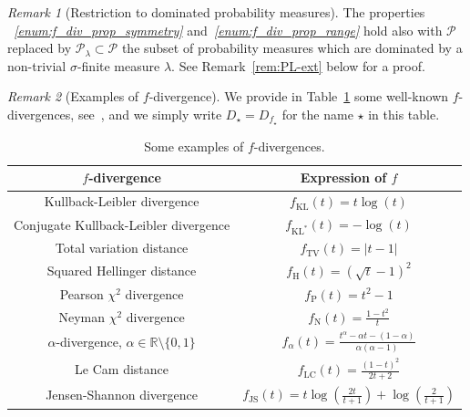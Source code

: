 \documentclass[12pt]{article}
\newcommand{\cp}{{\mathcal P}}
\newcommand{\R}{{\mathbb R}}
\theoremstyle{plain}
\theoremstyle{remark}
\newtheorem{rem}{Remark}
\begin{document}
\begin{rem}[Restriction to dominated probability measures]
  \label{rem:ext-to-Pl}
  The                          properties {\it ~\ref{enum:f_div_prop_symmetry}}
  and{\it ~\ref{enum:f_div_prop_range}}  hold  also  with  $\cp$  replaced  by
  $\cp_\lambda\subset\cp$ the  subset of probability measures  which are
  dominated  by a  non-trivial  $\sigma$-finite  measure $\lambda$.  See
  Remark~\ref{rem:PL-ext} below for a proof.
\end{rem}





\begin{rem}[Examples of $f$-divergence]
   \label{rem:exple-Df}
   We  provide  in Table~\ref{tab:list_of_fdivergence}  some  well-known
   $f$-divergences,  see~\cite{ca:abc-divergence},  and we  simply  write
   $D_\star=D_{f_\star}$ for the name $\star$ in this table.


\begin{table}[htbp]
    \renewcommand{\arraystretch}{1.25}
    \centering
    \begin{tabular}{|c|c|}
        \hline
        $f$-divergence & Expression of $f$
         \\
        \hline
        Kullback-Leibler divergence & $f_\mathrm{KL}(t) = t \log(t)$
        \\
        Conjugate Kullback-Leibler divergence & $f_{\mathrm{KL}^*}(t) = -\log(t)$
        \\
      Total variation distance & $f_\mathrm{TV}(t) = \vert t-1\vert$ \\
        Squared Hellinger distance & $f_\mathrm{H}(t) = \left(\sqrt{t}-1 \right)^2$\\
        Pearson $\chi^2$ divergence & $f_\mathrm{P}(t)= t^2-1$ \\
        Neyman $\chi^2$ divergence & $f_\mathrm{N}(t)= \frac{1-t^2}{t}$ \\
     $\alpha$-divergence, %
      $\alpha\in \R \setminus \{0,1\}$
                       & $f_\alpha(t) = \frac{t^\alpha -\alpha t
                         -(1-\alpha)}{\alpha (\alpha -1)}$     \\
      Le Cam distance & $f_\mathrm{LC}(t)= \frac{(1-t)^2}{2t+2}$ \\
        Jensen-Shannon divergence & $f_\mathrm{JS}(t)= t \log\left(\frac{2t}{t+1}\right) + \log\left(\frac{2}{t+1}\right)$ \\
        \hline
    \end{tabular}
    \caption{Some examples of $f$-divergences.}
    \label{tab:list_of_fdivergence}
\end{table}


\end{rem}
\end{document}
